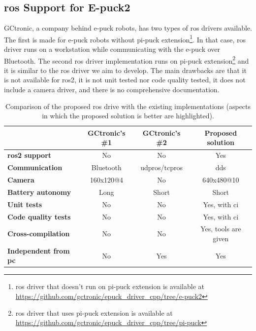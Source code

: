 \subsection{\ac{ros} Support for E-puck2}
GCtronic, a company behind e-puck robots, has two types of \ac{ros} drivers available. The first is made for e-puck robots without pi-puck extension\footnote{\ac{ros} driver that doesn't run on pi-puck extension is available at \url{https://github.com/gctronic/epuck_driver_cpp/tree/e-puck2}}. In that case, \ac{ros} driver runs on a workstation while communicating with the e-puck over Bluetooth. The second \ac{ros} driver implementation runs on pi-puck extension\footnote{\ac{ros} driver that uses pi-puck extension is available at \url{https://github.com/gctronic/epuck_driver_cpp/tree/pi-puck}} and it is similar to the \ac{ros} driver we aim to develop. The main drawbacks are that it is not available for \ac{ros2}, it is not unit tested nor code quality tested, it does not include a camera driver, and there is no comprehensive documentation.

\begin{table}[H]
    \begin{adjustwidth}{-1.5in}{-1.5in}
    \centering
    \begin{tabular}{|l|c|c|c|}
         \hline
         & \textbf{GCtronic's \#1} & \textbf{GCtronic's \#2} & \textbf{Proposed solution} \\
         \hline
         \rowcolor{lightgray} \textbf{\ac{ros2} support} & No & No & Yes \\
         \hline
         \rowcolor{lightgray} \textbf{Communication} & Bluetooth & \acs{udpros}/\acs{tcpros} & \ac{dds} \\
         \hline
         \rowcolor{lightgray} \textbf{Camera} & 160x120@4 & No & 640x480@10 \\
         \hline
         \textbf{Battery autonomy} & Long & Short & Short \\
         \hline
         \rowcolor{lightgray} \textbf{Unit tests} & No & No & Yes, with \ac{ci} \\
         \hline
         \rowcolor{lightgray} \textbf{Code quality tests} & No & No & Yes, with \ac{ci} \\
         \hline
         \rowcolor{lightgray} \textbf{Cross-compilation} & No & No & Yes, tools are given  \\
         \hline
         \rowcolor{lightgray} \textbf{Independent from \acs{pc}} & No & Yes & Yes  \\
         \hline
    \end{tabular}
    \end{adjustwidth}
    \caption{Comparison of the proposed \ac{ros} drive with the existing implementations (aspects in which the proposed solution is better are highlighted).}
    \label{tab:bacgrkound:epuck_ros}
\end{table}

